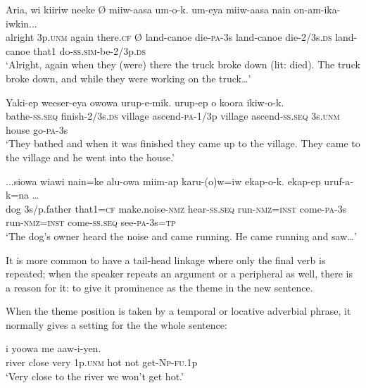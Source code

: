 \ea%
\label{ex:9:x1913}
\gll Aria,  wi  kiiriw  neeke  {\O}  miiw-aasa  um-o-k.   um-eya  miiw-aasa  nain  on-am-ika-iwkin... \\
alright  3p.\textsc{unm}  again  there.\textsc{cf}  {\O}  land-canoe  die-\textsc{pa}-3s land-canoe  die-2/3s.\textsc{ds}  land-canoe  that1  do-\textsc{ss}.\textsc{sim}-be-2/3p.\textsc{ds}     \\
\glt`Alright, again when they (were) there the truck broke down (lit: died). The truck broke down, and while they were working on the truck{\dots}'
\z


\ea\label{ex:9:x1914}
\gll   Yaki-ep  weeser-eya  owowa  urup-e-mik.   urup-ep  o  koora  ikiw-o-k.\\
bathe-\textsc{ss}.\textsc{seq}  finish-2/3s.\textsc{ds}  village  ascend-\textsc{pa}-1/3p  village  ascend-\textsc{ss}.\textsc{seq}  3s.\textsc{unm}  house  go-\textsc{pa}-3s\\
\glt`They bathed and when it was finished they came up to the village. They came to the village and he went into the house.'
\z



\ea%
\label{ex:9:x1915}
\gll ...siowa  wiawi  nain=ke  alu-owa  miim-ap karu-(o)w=iw  ekap-o-k.    ekap-ep uruf-a-k=na {\dots}\\
dog  3s/p.father  that1=\textsc{cf}  make.noise-\textsc{nmz}  hear-\textsc{ss}.\textsc{seq} run-\textsc{nmz}=\textsc{inst}  come-\textsc{pa}-3s  run-\textsc{nmz}=\textsc{inst}  come-\textsc{ss}.\textsc{seq} see-\textsc{pa}-3s=\textsc{tp}     \\
\glt`The dog's owner heard the noise and came running. He came running and saw{\dots}'
\z


It is more common to have a tail-head linkage where only the final verb is repeated; when the speaker repeats an argument or a peripheral as well, there is a reason for it: to give it prominence as the theme in the new sentence. 

When the theme position is taken by a temporal or locative adverbial phrase, it normally gives a setting for the the whole sentence:  

\ea%
\label{ex:9:x1699}
\gll {}    i  yoowa  me  aaw-i-yen. \\
river  close  very  1p.\textsc{unm}  hot  not  get-\textsc{Np}-\textsc{fu}.1p      \\
\glt`Very close to the river we won't get hot.'
\z


